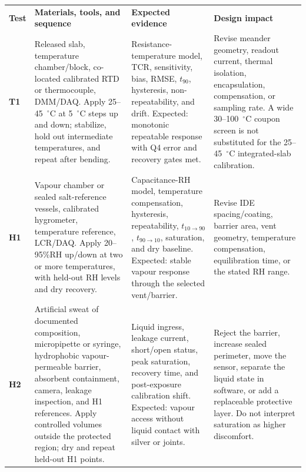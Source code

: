 \vspace{0.35em}
\begingroup
\fontsize{7.55}{8.85}\selectfont
\setlength{\tabcolsep}{2.5pt}\renewcommand{\arraystretch}{1.04}
\begin{tabularx}{\linewidth}{>{\raggedright\arraybackslash\bfseries\color{AUBRed}}p{0.95cm}Y Y Y}
\color{white}\textbf{Test} & \color{white}\textbf{Materials, tools, and sequence} &
\color{white}\textbf{Expected evidence} & \color{white}\textbf{Design impact} \\
T1 & Released slab, temperature chamber/block, co-located calibrated RTD or
thermocouple, DMM/DAQ. Apply 25--45~$^{\circ}$C at 5~$^{\circ}$C steps up and
down; stabilize, hold out intermediate temperatures, and repeat after bending.
& Resistance-temperature model, TCR, sensitivity, bias, RMSE, $t_{90}$,
hysteresis, non-repeatability, and drift. Expected: monotonic repeatable
response with Q4 error and recovery gates met. & Revise meander geometry,
readout current, thermal isolation, encapsulation, compensation, or sampling
rate. A wide 30--100~$^{\circ}$C coupon screen is not substituted for the
25--45~$^{\circ}$C integrated-slab calibration. \\
H1 & Vapour chamber or sealed salt-reference vessels, calibrated hygrometer,
temperature reference, LCR/DAQ. Apply 20--95\%RH up/down at two or more
temperatures, with held-out RH levels and dry recovery. & Capacitance-RH model,
temperature compensation, hysteresis, repeatability, $t_{10\rightarrow90}$,
$t_{90\rightarrow10}$, saturation, and dry baseline. Expected: stable vapour
response through the selected vent/barrier. & Revise IDE spacing/coating,
barrier area, vent geometry, temperature compensation, equilibration time, or
the stated RH range. \\
H2 & Artificial sweat of documented composition, micropipette or syringe,
hydrophobic vapour-permeable barrier, absorbent containment, camera, leakage
inspection, and H1 references. Apply controlled volumes outside the protected
region; dry and repeat held-out H1 points. & Liquid ingress, leakage current,
short/open status, peak saturation, recovery time, and post-exposure
calibration shift. Expected: vapour access without liquid contact with silver
or joints. & Reject the barrier, increase sealed perimeter, move the sensor,
separate the liquid state in software, or add a replaceable protective layer.
Do not interpret saturation as higher discomfort. \\
\end{tabularx}
\endgroup

